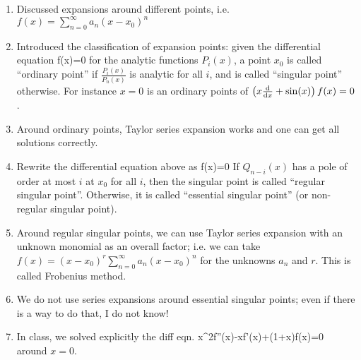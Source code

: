 {\begin{enumerate}
\item Discussed expansions around different points, i.e. $f(x)=\sum\limits_{n=0}^\infty a_n(x-x_0)^n$

\item Introduced the classification of expansion points: given the differential equation 
\be 
{}f(x)=0
\ee 
for the analytic functions $P_i(x)$, a point $x_0$ is called ``ordinary point'' if $\frac{P_i(x)}{P_n(x)}$ is analytic for all $i$, and is called ``singular point'' otherwise. For instance $x=0$ is an ordinary points of $\left(x\frac{\dd }{\dd x}+\sin(x)\right)f(x)=0$.
\item Around ordinary points, Taylor series expansion works and one can get all solutions correctly.
\item  Rewrite the differential equation above as 
\be 
{}f(x)=0
\ee
If $Q_{n-i}(x)$ has a pole of order at most $i$ at $x_0$ for all $i$, then the singular point is called ``regular singular point''. Otherwise, it is called ``essential singular point'' (or non-regular singular point).
\item Around regular singular points, we can use Taylor series expansion with an unknown monomial as an overall factor; i.e. we can take $f(x)=(x-x_0)^r\sum\limits_{n=0}^\infty a_n (x-x_0)^n$ for the unknowns $a_n$ and $r$. This is called Frobenius method.
\item We do not use series expansions around essential singular points; even if there is a way to do that, I do not know!
\item In class, we solved explicitly the diff eqn.
\be 
x^2f''(x)-xf'(x)+(1+x)f(x)=0
\ee 
around $x=0$.


\end{enumerate}}
